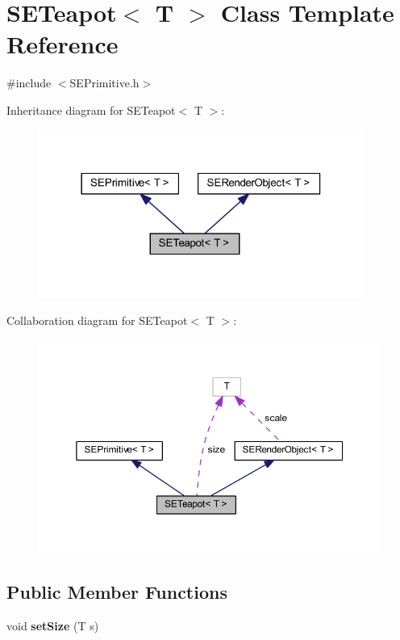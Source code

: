 \section{S\+E\+Teapot$<$ T $>$ Class Template Reference}
\label{class_s_e_teapot}


{\ttfamily \#include $<$S\+E\+Primitive.\+h$>$}



Inheritance diagram for S\+E\+Teapot$<$ T $>$\+:
\nopagebreak
\begin{figure}[H]
\begin{center}
\leavevmode
\includegraphics[width=302pt]{class_s_e_teapot__inherit__graph}
\end{center}
\end{figure}


Collaboration diagram for S\+E\+Teapot$<$ T $>$\+:
\nopagebreak
\begin{figure}[H]
\begin{center}
\leavevmode
\includegraphics[width=350pt]{class_s_e_teapot__coll__graph}
\end{center}
\end{figure}
\subsection*{Public Member Functions}
\begin{DoxyCompactItemize}
\item 
void {\bf set\+Size} (T s)
\end{DoxyCompactItemize}
